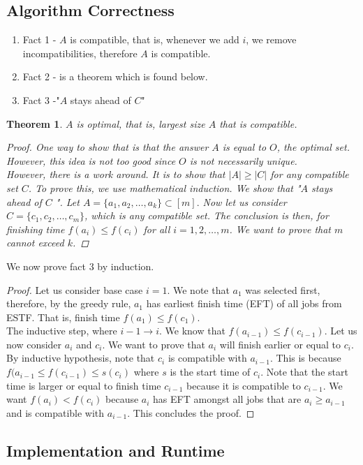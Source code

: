 \documentclass[a4paper]{article}
\theoremstyle{plain}
\newtheorem{thm}{Theorem}[section]
\theoremstyle{definition}
\theoremstyle{remark}
\begin{document}
	\subsection{Algorithm Correctness}
	\begin{enumerate}
		\item Fact 1 - $A$ is compatible, that is, whenever we add $i$, we remove incompatibilities, therefore $A$ is compatible.
		\item Fact 2 - is a theorem which is found below.
		\item Fact 3 -"$A$ stays ahead of $C$"
	\end{enumerate}
	\begin{thm}
		$A$ is optimal, that is, largest size $A$ that is compatible.
		\begin{proof}
			One way to show that is that the answer $A$ is equal to $O$, the optimal set. However, this idea is not too good since $O$ is not necessarily unique. \\
			However, there is a work around. It is to show that $|A| \ge |C|$ for any compatible set $C$. To prove this, we use mathematical induction. We show that "$A$ stays ahead of $C$ ". Let $A=\{a_1,a_2,\ldots,a_k\} \subset [m].$ Now let us consider $C = \{c_1,c_2,\ldots,c_m\}$, which is any compatible set. The conclusion is then, for finishing time $f(a_i) \le f(c_i)$ for all $i=1,2,\ldots,m$. We want to prove that $m$ cannot exceed $k$.
		\end{proof}
	\end{thm}
	We now prove fact $3$ by induction.
	\begin{proof}
		Let us consider base case $i=1$. We note that $a_1$ was selected first, therefore, by the greedy rule, $a_1$ has earliest finish time (EFT) of all jobs from ESTF. That is, finish time $f(a_1)\le f(c_1)$. \\
		The inductive step, where $i-1 \to i$. We know that $f(a_{i-1})\le f(c_{i-1}) $. Let us now consider $a_i$ and $c_i$. We want to prove that $a_i$ will finish earlier or equal to $c_i$. By inductive hypothesis, note that $c_i$ is compatible with $a_{i-1}$. This is because $f(a_{i-1}\le f(c_{i-1})\le s(c_i)$ where $s$ is the start time of $c_i$. Note that the start time is larger or equal to finish time $c_{i-1}$ because it is compatible to  $c_{i-1}$. We want $f(a_i)<f(c_i)$ because $a_i$ has EFT amongst all jobs that are $a_i\ge a_{i-1}$ and is compatible with $a_{i-1}$. This concludes the proof.
	\end{proof}
	\subsection{Implementation and Runtime}
	
\end{document}

